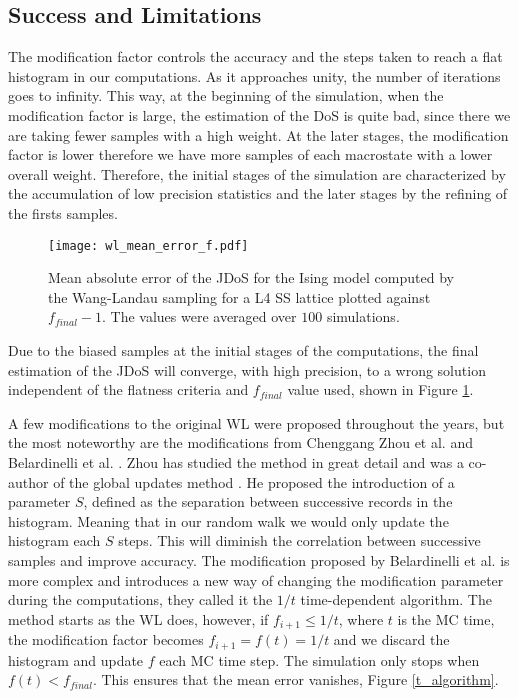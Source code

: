 \subsection{Success and Limitations}

The modification factor controls the accuracy and the steps taken to reach a flat histogram in our computations. As it approaches unity, the number of iterations goes to infinity. This way, at the beginning of the simulation, when the modification factor is large, the estimation of the DoS is quite bad, since there we are taking fewer samples with a high weight. At the later stages, the modification factor is lower therefore we have more samples of each macrostate with a lower overall weight. 
Therefore, the initial stages of the simulation are characterized by the accumulation of low precision statistics and the later stages by the refining of the firsts samples. 

\begin{figure}[h]
	\centering
	\texttt{[image: wl\_mean\_error\_f.pdf]}
	\caption{Mean absolute error of the JDoS for the Ising model computed by the Wang-Landau sampling for a L4 SS lattice plotted against $f_{final}-1$. The values were averaged over $100$ simulations. }
	\label{error_abs_wl}
\end{figure}

Due to the biased samples at the initial stages of the computations, the final estimation of the JDoS will converge, with high precision, to a wrong solution independent of the flatness criteria and $f_{final}$ value used, shown in Figure \ref{error_abs_wl}. 

A few modifications to the original WL were proposed throughout the years, but the most noteworthy  are the modifications from Chenggang Zhou et al. \cite{Zhou2005} and Belardinelli et al. \cite{Belardinelli2007}. Zhou has studied the method in great detail \cite{Zhou2005} and was a co-author of the global updates method \cite{WL_Cont}. He proposed the introduction of a parameter $S$, defined as the separation between successive records in the histogram. Meaning that in our random walk we would only update the histogram each $S$ steps. This will diminish the correlation between successive samples and improve accuracy.  
The modification proposed by Belardinelli et al. is more complex and introduces a new way of changing the modification parameter during the computations, they called it the $1/t$ time-dependent algorithm. The method starts as the WL does, however, if $f_{i+1} \leqslant 1/t$, where $t$ is the MC time, the modification factor becomes $f_{i+1} = f(t) = 1/t$ and we discard the histogram and update $f$ each MC time step. The simulation only stops when $f(t) < f_{final}$. This ensures that the mean error vanishes, Figure \ref{t_algorithm}.


